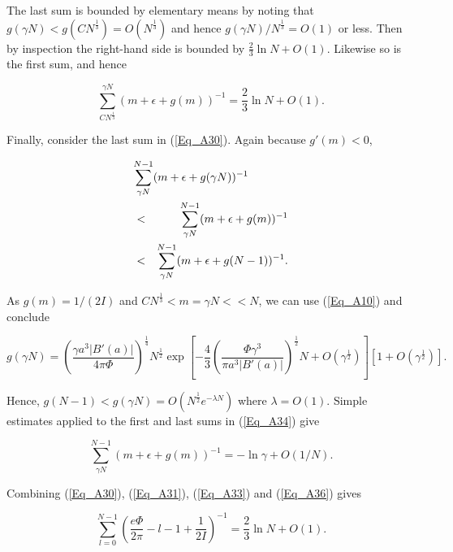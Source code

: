 \documentclass[a4paper,twocolumn,showpacs,preprintnumbers,amsmath,amssymb]{revtex4}
\newcommand{\half}{\frac{1}{2}}
\begin{document}
\noindent
The last sum is bounded by elementary means by noting that
$g(\gamma N) < g(CN^{\frac{1}{3}}) = O(N^{\frac{1}{3}})$ and hence
$g(\gamma N) / N^{\frac{1}{3}} = O(1)$ or less. Then by inspection the
right-hand side is bounded by $\frac{2}{3} \ln N + O(1)$. Likewise so
is the first sum, and hence

\begin{equation}
\label{Eq_A33}
\sum^{\gamma N}_{CN^{\frac{1}{3}}} (m + \epsilon + g(m))^{-1}
  = \frac{2}{3} \ln N + O(1).
\end{equation}

Finally, consider the last sum in (\ref{Eq_A30}). Again because
$g'(m) < 0$,

\begin{eqnarray}
\nonumber
\lefteqn{\sum^{N-1}_{\gamma N} (m + \epsilon + g(\gamma N))^{-1}}\\
\nonumber
  &<& \sum^{N-1}_{\gamma N} (m + \epsilon + g(m))^{-1}\\
\label{Eq_A34}
  &<& \sum^{N-1}_{\gamma N} (m + \epsilon + g(N-1))^{-1}.
\end{eqnarray}

\noindent
As $g(m) = 1 / (2I)$ and $CN^{\frac{1}{3}} < m = \gamma N << N$,
we can use (\ref{Eq_A10}) and conclude

\begin{widetext}
\begin{equation}
\label{Eq_A35}
g(\gamma N)
  = \left(\frac{\gamma a^3|B'(a)|}{4\pi\Phi}\right)^{\frac{1}{4}}
  N^{\half}
  \exp
  \left[
  - \frac{4}{3} \left(\frac{\Phi\gamma^3}{\pi a^3|B'(a)|}\right)^{\half}
  N + O\left(\gamma^{\half}\right)
  \right]
  \left[1 + O\left(\gamma^{\half}\right)\right].
\end{equation}
\end{widetext}

\noindent
Hence, $g(N-1) < g(\gamma N) = O(N^{\half} e^{-\lambda N})$ where
$\lambda = O(1)$. Simple estimates applied to the first and last sums
in (\ref{Eq_A34}) give

\begin{equation}
\label{Eq_A36}
\sum^{N-1}_{\gamma N} (m + \epsilon + g(m))^{-1} = - \ln \gamma + O(1/N).
\end{equation}

\noindent
Combining (\ref{Eq_A30}), (\ref{Eq_A31}), (\ref{Eq_A33}) and
(\ref{Eq_A36}) gives

\begin{equation}
\label{Eq_A37}
\sum^{N-1}_{l=0}
  \left( \frac{e\Phi}{2\pi} - l - 1 + \frac{1}{2I} \right)^{-1}
  = \frac{2}{3} \ln N + O(1).
\end{equation}
\end{document}
